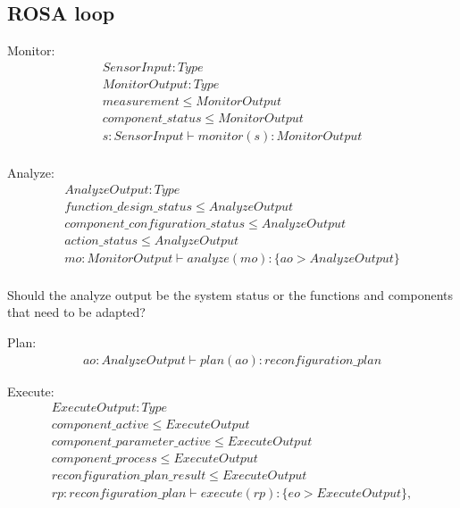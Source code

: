 \subsection{ROSA loop}

Monitor:
\begin{gather}
    SensorInput : Type \\
    MonitorOutput: Type \\
    measurement \leq MonitorOutput \\
    component\_status \leq MonitorOutput \\
    s: SensorInput \vdash monitor(s) : MonitorOutput \\
\end{gather}

Analyze:
\begin{gather}
    AnalyzeOutput: Type \\
    function\_design\_status \leq AnalyzeOutput \\
    component\_configuration\_status \leq AnalyzeOutput \\
    action\_status \leq AnalyzeOutput \\
    mo : MonitorOutput \vdash analyze(mo) : \{ ao>AnalyzeOutput \}\\
\end{gather}

Should the analyze output be the system status or the functions and components that need to be adapted?


Plan:
\begin{gather}
    ao: AnalyzeOutput \vdash plan(ao) : reconfiguration\_plan 
\end{gather}

Execute:
\begin{gather}
    ExecuteOutput : Type \\
    component\_active \leq ExecuteOutput \\
    component\_parameter\_active \leq ExecuteOutput \\
    component\_process \leq ExecuteOutput \\
    reconfiguration\_plan\_result \leq ExecuteOutput \\
    rp : reconfiguration\_plan \vdash execute(rp) : \{ eo>ExecuteOutput \}, 
\end{gather}

